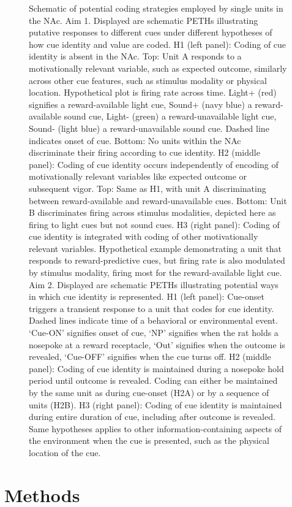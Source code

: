 \documentclass[11pt]{article}
\begin{document}
\begin{figure}[h]
\caption{Schematic of potential coding strategies employed by single units in the NAc. Aim 1. Displayed are schematic PETHs illustrating putative responses to different cues under different hypotheses of how cue identity and value are coded. H1 (left panel): Coding of cue identity is absent in the NAc. Top: Unit A responds to a motivationally relevant variable, such as expected outcome, similarly across other cue features, such as stimulus modality or physical location. Hypothetical plot is firing rate across time. Light+ (red) signifies a reward-available light cue, Sound+ (navy blue) a reward-available sound cue, Light- (green) a reward-unavailable light cue, Sound- (light blue) a reward-unavailable sound cue. Dashed line indicates onset of cue. Bottom: No units within the NAc discriminate their firing according to cue identity. H2 (middle panel): Coding of cue identity occurs independently of encoding of motivationally relevant variables like expected outcome or subsequent vigor. Top: Same as H1, with unit A discriminating between reward-available and reward-unavailable cues. Bottom: Unit B discriminates firing across stimulus modalities, depicted here as firing to light cues but not sound cues. H3 (right panel): Coding of cue identity is integrated with coding of other motivationally relevant variables. Hypothetical example demonstrating a unit that responds to reward-predictive cues, but firing rate is also modulated by stimulus modality, firing most for the reward-available light cue. Aim 2. Displayed are schematic PETHs illustrating potential ways in which cue identity is represented. H1 (left panel): Cue-onset triggers a transient response to a unit that codes for cue identity. Dashed lines indicate time of a behavioral or environmental event. ‘Cue-ON’ signifies onset of cue, ‘NP’ signifies when the rat holds a nosepoke at a reward receptacle, ‘Out’ signifies when the outcome is revealed, ‘Cue-OFF’ signifies when the cue turns off. H2 (middle panel): Coding of cue identity is maintained during a nosepoke hold period until outcome is revealed. Coding can either be maintained by the same unit as during cue-onset (H2A) or by a sequence of units (H2B). H3 (right panel): Coding of cue identity is maintained during entire duration of cue, including after outcome is revealed. Same hypotheses applies to other information-containing aspects of the environment when the cue is presented, such as the physical location of the cue.}
\label{fig:schematic}
\end{figure}

\section*{Methods}
\end{document}

